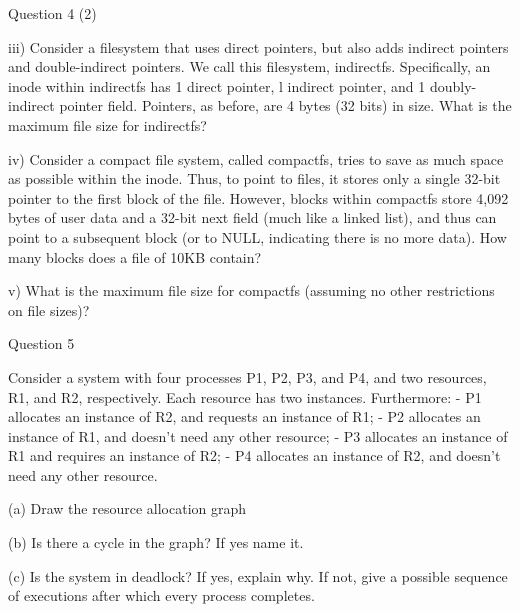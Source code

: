   \begin{frame}{Question 4 (2)}

    iii) Consider a filesystem that uses direct pointers, but also adds
indirect pointers and double-indirect pointers. We call this filesystem,
indirectfs. Specifically, an inode within indirectfs has 1 direct pointer, l
indirect pointer, and 1 doubly-indirect pointer field. Pointers, as before, are 4
bytes (32 bits) in size. What is the maximum file size for indirectfs?

    \vspace{1em}

    iv) Consider a compact file system, called compactfs, tries to save as
much space as possible within the inode. Thus, to point to files, it stores only a
single 32-bit pointer to the first block of the file. However, blocks within
compactfs store 4,092 bytes of user data and a 32-bit next field (much like a
linked list), and thus can point to a subsequent block (or to NULL, indicating
there is no more data). How many blocks does a file of 10KB contain?

    \vspace{1em}

    v) What is the maximum file size for compactfs (assuming no other
restrictions on file sizes)?
  \end{frame}

  \begin{frame}{Question 5}

    Consider a system with four processes P1, P2, P3, and P4, and two
resources, R1, and R2, respectively. Each resource has two instances. Furthermore: -
P1 allocates an instance of R2, and requests an instance of R1; - P2 allocates an
instance of R1, and doesn’t need any other resource; - P3 allocates an instance of R1
and requires an instance of R2; - P4 allocates an instance of R2, and doesn’t need any
other resource.

    \vspace{1em}

    (a) Draw the resource allocation graph

    \vspace{1em}

    (b) Is there a cycle in the graph? If yes name it.

    \vspace{1em}

    (c) Is the system in deadlock? If yes, explain why. If not, give a possible sequence of executions after which every process completes.
  \end{frame}

